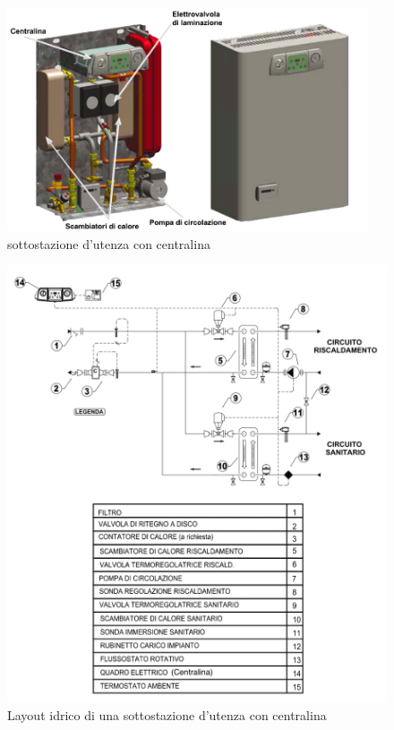 \documentclass[laurea,oneside,11pt]{USiena_tesiLM}
\begin{document}
\begin{figure}[!ht]
\centering
\includegraphics[width=0.95\textwidth]{figure/centralina} 
\caption{sottostazione d'utenza con centralina}
\label{fig:centralina}
\end{figure}

\begin{figure}[!ht]
\centering
\includegraphics[width=\textwidth]{figure/schema_centralina2} 
\caption{Layout idrico di una sottostazione d'utenza con centralina}
\label{fig:schema_centralina2}
\end{figure}
\end{document}
